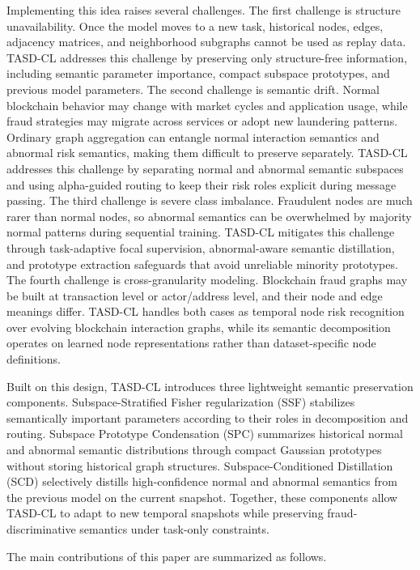 Implementing this idea raises several challenges. The first challenge is structure unavailability. Once the model moves to a new task, historical nodes, edges, adjacency matrices, and neighborhood subgraphs cannot be used as replay data. TASD-CL addresses this challenge by preserving only structure-free information, including semantic parameter importance, compact subspace prototypes, and previous model parameters. The second challenge is semantic drift. Normal blockchain behavior may change with market cycles and application usage, while fraud strategies may migrate across services or adopt new laundering patterns. Ordinary graph aggregation can entangle normal interaction semantics and abnormal risk semantics, making them difficult to preserve separately. TASD-CL addresses this challenge by separating normal and abnormal semantic subspaces and using alpha-guided routing to keep their risk roles explicit during message passing. The third challenge is severe class imbalance. Fraudulent nodes are much rarer than normal nodes, so abnormal semantics can be overwhelmed by majority normal patterns during sequential training. TASD-CL mitigates this challenge through task-adaptive focal supervision, abnormal-aware semantic distillation, and prototype extraction safeguards that avoid unreliable minority prototypes. The fourth challenge is cross-granularity modeling. Blockchain fraud graphs may be built at transaction level or actor/address level, and their node and edge meanings differ. TASD-CL handles both cases as temporal node risk recognition over evolving blockchain interaction graphs, while its semantic decomposition operates on learned node representations rather than dataset-specific node definitions.

Built on this design, TASD-CL introduces three lightweight semantic preservation components. Subspace-Stratified Fisher regularization (SSF) stabilizes semantically important parameters according to their roles in decomposition and routing. Subspace Prototype Condensation (SPC) summarizes historical normal and abnormal semantic distributions through compact Gaussian prototypes without storing historical graph structures. Subspace-Conditioned Distillation (SCD) selectively distills high-confidence normal and abnormal semantics from the previous model on the current snapshot. Together, these components allow TASD-CL to adapt to new temporal snapshots while preserving fraud-discriminative semantics under task-only constraints.

The main contributions of this paper are summarized as follows.

